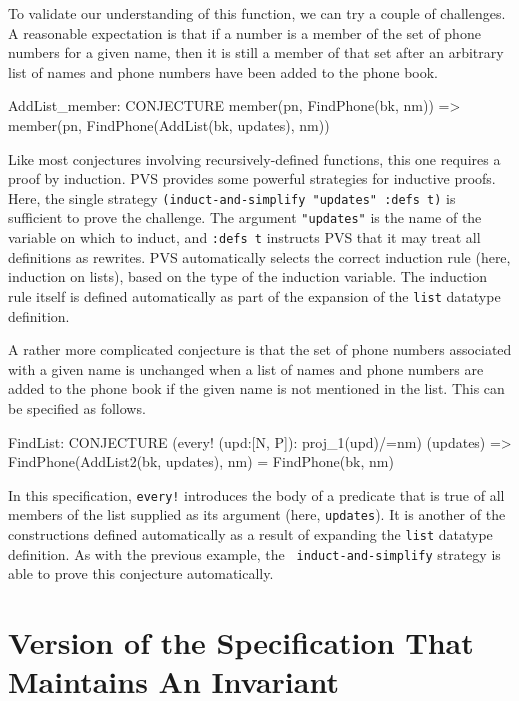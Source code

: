 To validate our understanding of this function, we can try a couple of
challenges.  A reasonable expectation is that if a number is a member
of the set of phone numbers for a given name, then it is still a member
of that set after an arbitrary list of names and phone numbers have
been added to the phone book.
\begin{jmrsession}
  AddList_member: CONJECTURE
    member(pn, FindPhone(bk, nm)) =>
       member(pn, FindPhone(AddList(bk, updates), nm))
\end{jmrsession}
Like most conjectures involving recursively-defined functions, this
one requires a proof by induction.  PVS provides some powerful
strategies for inductive proofs.  Here, the single strategy
{\tt (induct-and-simplify "updates" :defs t)}
is sufficient to prove the challenge.  The argument {\tt "updates"} is
the name of the variable on which to induct, and {\tt :defs t}
instructs PVS that it may treat all definitions as rewrites.  PVS
automatically selects the correct induction rule (here, induction on
lists), based on the type of the induction variable.  The induction
rule itself is defined automatically as part of the expansion of the
{\tt list} datatype definition.

A rather more complicated conjecture is that the set of phone numbers
associated with a given name is unchanged when a list of names and
phone numbers are added to the phone book if the given name is not
mentioned in the list.  This can be specified as follows.
\begin{jmrsession}
  FindList: CONJECTURE
    (every! (upd:[N, P]): proj_1(upd)/=nm) (updates) =>
      FindPhone(AddList2(bk, updates), nm) = FindPhone(bk, nm)
\end{jmrsession}
In this specification, {\tt every!} introduces the body of a predicate
that is true of all members of the list supplied as its argument
(here, {\tt updates}).  It is another of the constructions defined
automatically as a result of expanding the {\tt list} datatype
definition.  As with the previous example, the {\tt
induct-and-simplify} strategy is able to prove this conjecture
automatically.


\section{Version of the Specification That Maintains An Invariant}


